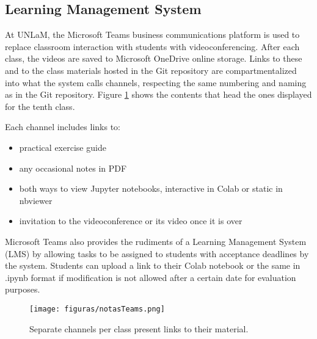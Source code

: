 



\subsection{Learning Management System}
At UNLaM, the Microsoft Teams business communications platform is used to replace classroom interaction with students with videoconferencing. After each class, the videos are saved to Microsoft OneDrive online storage. Links to these and to the class materials hosted in the Git repository are compartmentalized into what the system calls channels, respecting the same numbering and naming as in the Git repository. Figure \ref{fig:teams} shows the contents that head the ones displayed for the tenth class.

Each channel includes links to:
\begin{itemize}
    \item practical exercise guide
    \item any occasional notes in PDF
    \item both ways to view Jupyter notebooks, interactive in Colab or static in nbviewer
    \item invitation to the videoconference or its video once it is over
\end{itemize}

Microsoft Teams also provides the rudiments of a Learning Management System (LMS) by allowing tasks to be assigned to students with acceptance deadlines by the system. Students can upload a link to their Colab notebook or the same in .ipynb format if modification is not allowed after a certain date for evaluation purposes.

\begin{figure}[!ht]
\centering
\texttt{[image: figuras/notasTeams.png]}
\caption{Separate channels per class present links to their material.}
\label{fig:teams}
\end{figure}
